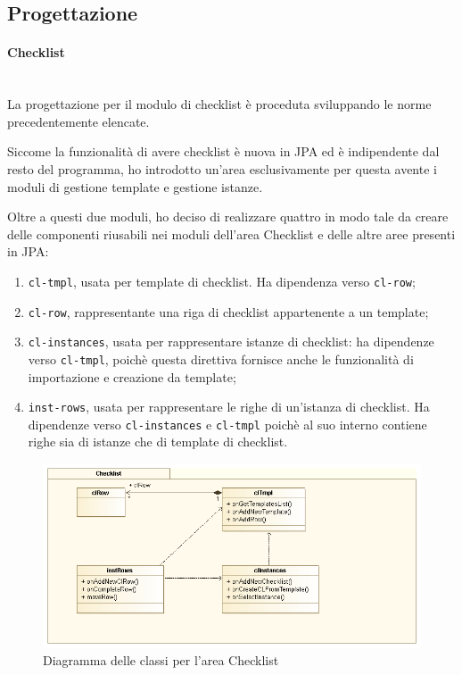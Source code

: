 \subsection{Progettazione}\label{sec:prog-progettazione}

\paragraph{Checklist} \mbox{} \\

La progettazione per il modulo di checklist è proceduta sviluppando le norme
precedentemente elencate.

Siccome la funzionalità di avere checklist è nuova in JPA ed è indipendente
dal resto del programma, ho introdotto un'area esclusivamente per questa
avente i moduli di gestione template e gestione istanze.

Oltre a questi due moduli, ho deciso di realizzare quattro
 in modo tale da creare delle componenti riusabili nei
moduli dell'area Checklist e delle altre aree presenti in JPA:

\begin{enumerate}
\item \texttt{cl-tmpl}, usata per template di checklist. Ha dipendenza verso
  \texttt{cl-row};
\item \texttt{cl-row},  rappresentante una riga di checklist
  appartenente a un template;
\item \texttt{cl-instances}, usata per rappresentare istanze di checklist: ha
  dipendenze verso \texttt{cl-tmpl}, poichè questa direttiva fornisce anche le
  funzionalità di importazione e creazione da template;
\item \texttt{inst-rows}, usata per rappresentare le righe di un'istanza di
  checklist. Ha dipendenze verso \texttt{cl-instances} e \texttt{cl-tmpl}
  poichè al suo interno contiene righe sia di istanze che di template di
  checklist.
\end{enumerate}

\begin{figure}[H]%
\centering
\includegraphics[width=\columnwidth]{immagini/cl-plugin}
\caption{Diagramma delle classi per l'area Checklist}
\label{fig:checklist-cd}%
\end{figure}

